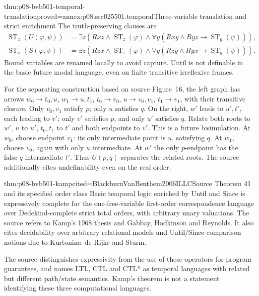 \begin{hbtheorem}{thm:p08-bvb501-temporal-translation}{proved=annex:p08.src025501.temporal}{Three-variable translation and strict enrichment}
The truth-preserving clauses are
\[
 \begin{aligned}
 \operatorname{ST}_x(U(\varphi,\psi))&=
  \exists z(Rxz\land\operatorname{ST}_z(\varphi)\land
       \forall y(Rxy\land Ryz\to\operatorname{ST}_y(\psi))),\\
 \operatorname{ST}_x(S(\varphi,\psi))&=
  \exists z(Rzx\land\operatorname{ST}_z(\varphi)\land
       \forall y(Rzy\land Ryx\to\operatorname{ST}_y(\psi))).
 \end{aligned}
\]
Bound variables are renamed locally to avoid capture. Until is not
definable in the basic future modal language, even on finite transitive
irreflexive frames.
\end{hbtheorem}

For the separating construction based on source Figure~16, the left graph has arrows
\(w_0\to t_0,u\), \(w_1\to u,t_1\),
\(t_0\to v_0\), \(u\to v_0,v_1\), \(t_1\to v_1\),
with their transitive closure. Only \(v_0,v_1\) satisfy \(p\);
only \(u\) satisfies \(q\). On the right, \(w'\) leads to
\(u',t'\), each leading to \(v'\); only \(v'\) satisfies
\(p\), and only \(u'\) satisfies \(q\). Relate both roots to
\(w'\), \(u\) to \(u'\), \(t_0,t_1\) to \(t'\)
and both endpoints to \(v'\). This is a future bisimulation.
At \(w_0\), choose endpoint \(v_1\): its only intermediate
point is \(u\), satisfying \(q\). At \(w_1\), choose
\(v_0\), again with only \(u\) intermediate. At \(w'\) the only
\(p\)-endpoint has the false-\(q\) intermediate \(t'\).
Thus \(U(p,q)\) separates the related roots. The source additionally
cites undefinability even on the real order.

\begin{hbtheorem}{thm:p08-bvb501-kamp}{cited=BlackburnVanBenthem2006ILLC}{Source Theorem 41 and its specified order class}
Basic temporal logic enriched by Until and Since is expressively complete
for the one-free-variable first-order correspondence language over
Dedekind-complete strict total orders, with arbitrary unary valuations.
The source refers to Kamp's 1968 thesis and Gabbay, Hodkinson and Reynolds.
It also cites decidability over arbitrary relational models and
Until/Since comparison notions due to Kurtonina--de Rijke and Sturm.
\end{hbtheorem}

The source distinguishes expressivity from the use of these operators
for program guarantees, and names LTL, CTL and CTL* as temporal languages
with related but different path/state semantics. Kamp's theorem is not
a statement identifying these three computational languages.

